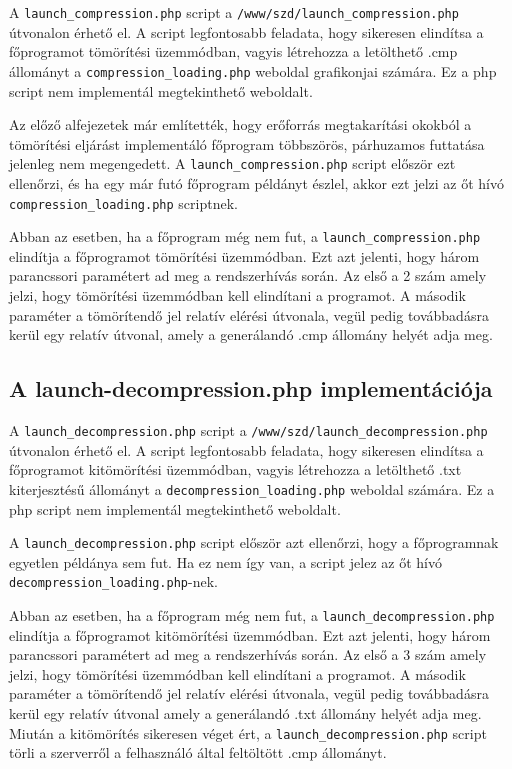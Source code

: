 \documentclass[oneside,titlepage,12pt,a4paper]{report}
\begin{document}
A \texttt{launch\_compression.php} script a \texttt{/www/szd/launch\_compression.php} útvonalon érhető el. A script legfontosabb feladata, hogy sikeresen elindítsa a főprogramot tömörítési üzemmódban, vagyis létrehozza a letölthető .cmp állományt a \linebreak \texttt{compression\_loading.php} weboldal grafikonjai számára. Ez a php script nem implementál megtekinthető weboldalt.
\par Az előző alfejezetek már említették, hogy erőforrás megtakarítási okokból a tömörítési eljárást implementáló főprogram többszörös, párhuzamos futtatása jelenleg nem megengedett. A \texttt{launch\_compression.php} script először ezt ellenőrzi, és ha egy már futó főprogram példányt észlel, akkor ezt jelzi az őt hívó \texttt{compression\_loading.php} scriptnek.
\par Abban az esetben, ha a főprogram még nem fut, a \texttt{launch\_compression.php}  elindítja a főprogramot tömörítési üzemmódban. Ezt azt jelenti, hogy három parancssori paramétert ad meg a rendszerhívás során. Az első a 2 szám amely jelzi, hogy tömörítési üzemmódban kell elindítani a programot. A második paraméter a tömörítendő jel relatív elérési útvonala, vegül pedig továbbadásra kerül egy relatív útvonal, amely a generálandó .cmp állomány helyét adja meg.

\subsection{A launch-decompression.php implementációja}

A \texttt{launch\_decompression.php} script a \texttt{/www/szd/launch\_decompression.php} útvonalon érhető el. A script legfontosabb feladata, hogy sikeresen elindítsa a főprogramot kitömörítési üzemmódban, vagyis létrehozza a letölthető .txt kiterjesztésű állományt a \texttt{decompression\_loading.php} weboldal számára. Ez a php script nem implementál megtekinthető weboldalt.
\par A \texttt{launch\_decompression.php} script először azt ellenőrzi, hogy a főprogramnak egyetlen példánya sem fut. Ha ez nem így van, a script jelez az őt hívó \texttt{decompression\_loading.php}-nek. 
\par Abban az esetben, ha a főprogram még nem fut, a \texttt{launch\_decompression.php}  elindítja a főprogramot kitömörítési üzemmódban. Ezt azt jelenti, hogy három parancssori paramétert ad meg a rendszerhívás során. Az első a 3 szám amely jelzi, hogy tömörítési üzemmódban kell elindítani a programot. A második paraméter a tömörítendő jel relatív elérési útvonala, vegül pedig továbbadásra kerül egy relatív útvonal amely a generálandó .txt állomány helyét adja meg. Miután a kitömörítés sikeresen véget ért, a \texttt{launch\_decompression.php} script törli a szerverről a felhasználó által feltöltött .cmp állományt. 
\end{document}
